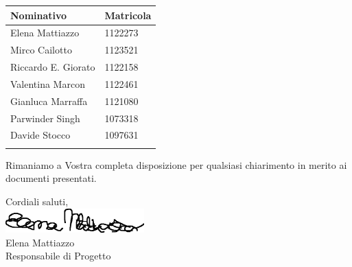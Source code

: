 \documentclass[openany, a4paper, 12pt]{letter}
\newcommand{\Valentina}{Valentina Marcon\xspace}
\newcommand{\Mirco}{Mirco Cailotto\xspace}
\newcommand{\Riccardo}{Riccardo E. Giorato\xspace}
\newcommand{\Davide}{Davide Stocco\xspace}
\newcommand{\Parwinder}{Parwinder Singh\xspace}
\newcommand{\Elena}{Elena Mattiazzo\xspace}
\newcommand{\Gianluca}{Gianluca Marraffa\xspace}
\begin{document}
\begin{letter}
		\renewcommand*{\arraystretch}{1.2}
		\begin{longtable}[H]{p{6cm}p{2.5cm}}
			\rowcolor{CHeader}   
			\color{CHeaderText} \textbf{Nominativo} & \color{CHeaderText} \textbf{Matricola}\\
			\endhead
			\Elena & 1122273 \\
			\Mirco & 1123521 \\
			\Riccardo & 1122158 \\
			\Valentina &  1122461 \\
			\Gianluca & 1121080 \\
			\Parwinder & 1073318 \\
			\Davide & 1097631 \\
			\hiderowcolors
		\end{longtable}
		
		Rimaniamo a Vostra completa disposizione per qualsiasi chiarimento in merito ai documenti presentati.
		\begin{flushleft}
			Cordiali saluti,\\
			\includegraphics[width=0.4\textwidth]{firmaResp}\\
			Elena Mattiazzo\\
			Responsabile di Progetto\\
		\end{flushleft}
	\end{letter}
\end{document}

